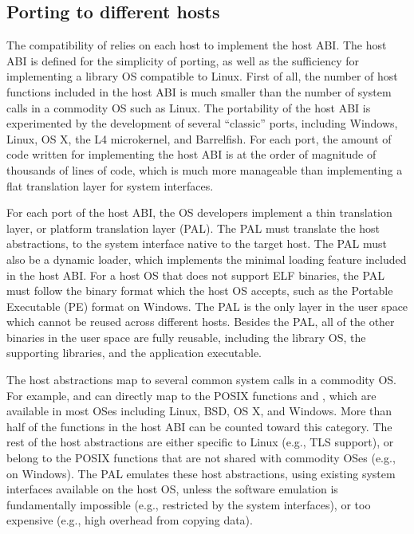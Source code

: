\subsection{Porting to different hosts}
\label{sec:overview:host:porting}


The compatibility of \graphene{} relies on each host to implement the host ABI.
The host ABI is defined for the simplicity of porting, as well as the sufficiency for implementing a library OS compatible to Linux.
First of all, the number of host functions included in the host ABI
is much smaller than the number of system calls in a commodity OS such as Linux. 
The portability of the host ABI is experimented by
the development of
several ``classic'' \graphene{} ports, including Windows, Linux, OS X,
the L4 microkernel, and Barrelfish.
For each port, the amount of code written for implementing the host ABI is at the order of magnitude of thousands of lines of code, which is much more manageable than implementing a flat translation layer for system interfaces.


For each port of the host ABI, the OS developers implement a thin translation layer,
or platform translation layer (PAL). The PAL must translate the host abstractions, to the system interface native to the target host. 
The PAL must also be a dynamic loader, which implements the minimal loading feature included in the host ABI.
For a host OS that does not support ELF binaries, the PAL must follow the binary format which the host OS accepts, such as the Portable Executable (PE) format on Windows.
The PAL is the only layer in the user space which cannot be reused
across different hosts. Besides the PAL, all of the other binaries in the user space are fully reusable, including the library OS, the supporting libraries, and the application executable.



The host abstractions map to several common system calls in a commodity OS.
For example,  and  can directly map to the POSIX functions  and , which are available in most OSes including Linux, BSD, OS X, and Windows.
More than half of the functions in the host ABI can be counted toward this category.
The rest of the host abstractions are either specific to Linux
(e.g., TLS support),
or belong to the POSIX functions that are not shared with commodity OSes
(e.g.,  on Windows).
The PAL emulates these host abstractions, using existing system interfaces available on the host OS, unless the software emulation is fundamentally impossible (e.g., restricted by the system interfaces), or too expensive (e.g., high overhead from copying data).






